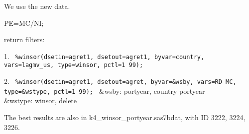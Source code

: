 

\usepackage[T1]{fontenc}




\thispagestyle{fancy}

\newcommand{\code}{\texttt}
\newcommand*{\Commonpath}{20190410}

We use the new data.

PE=MC/NI;

return filters:

1. \code{
\%winsor(dsetin=agret1, dsetout=agret1, byvar=country, vars=lagmv\_us, type=winsor, pctl=1 99);
}

2. \code{
\%winsor(dsetin=agret1, dsetout=agret, byvar=\&wsby, vars=RD MC, type=\&wstype, pctl=1 99);
} 
\&wsby: portyear, country portyear \\
\&wstype: winsor, delete



The best results are also in k4\_winsor\_portyear.sas7bdat, with ID 3222, 3224, 3226.






